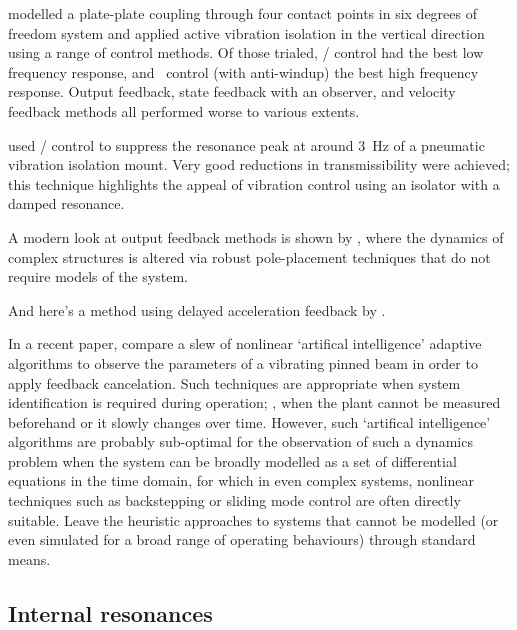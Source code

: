 \textcite{kerber2007} modelled a plate-plate coupling through four
contact points in six degrees of freedom system and applied active
vibration isolation in the vertical direction using a range of control
methods. Of those trialed, \Hinf/ control had the best low frequency
response, and \PI\ control (with anti-windup) the best high
frequency response. Output feedback, state feedback with an observer,
and velocity feedback methods all performed worse to various extents.

\textcite{chen2007} used \Hinf/ control to suppress the resonance peak at
around \SI{3}{Hz} of a pneumatic vibration isolation mount. Very good
reductions in transmissibility were achieved; this technique highlights the
appeal of vibration control using an isolator with a damped resonance.

A modern look at output feedback methods is shown by \cite{mottershead2008},
where the dynamics of complex structures is altered via robust pole-placement
techniques that do not require models of the system.

And here's a method using delayed acceleration feedback by
\textcite{chatterjee2008}.


In a recent paper, \textcite{madkour2007} compare a slew of nonlinear
`artifical intelligence' adaptive algorithms to observe the parameters
of a vibrating pinned beam in order to apply feedback cancelation.
Such techniques are appropriate when system identification is required
during operation; \ie, when the plant cannot be measured beforehand or
it slowly changes over time. However, such `artifical intelligence'
algorithms are probably sub-optimal for the observation of such a
dynamics problem when the system can be broadly modelled as a set of
differential equations in the time domain, for which in even complex systems,
nonlinear techniques such as backstepping or sliding mode control are 
often directly suitable. Leave the heuristic approaches to systems that cannot be
modelled (or even simulated for a broad range of operating behaviours) through standard means.
  
  

\subsection{Internal resonances}

